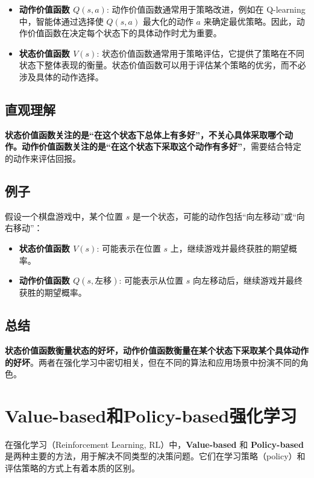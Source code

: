 \documentclass[twocolumn, 10pt]{article} %
\theoremstyle{remark}
\begin{document}
\begin{itemize}
    \item \textbf{动作价值函数 \(Q(s, a)\)}: 动作价值函数通常用于策略改进，例如在 Q-learning 中，智能体通过选择使 \(Q(s, a)\) 最大化的动作 \(a\) 来确定最优策略。因此，动作价值函数在决定每个状态下的具体动作时尤为重要。

    \item \textbf{状态价值函数 \(V(s)\)}: 状态价值函数通常用于策略评估，它提供了策略在不同状态下整体表现的衡量。状态价值函数可以用于评估某个策略的优劣，而不必涉及具体的动作选择。
\end{itemize}

\subsection{直观理解}

\textbf{状态价值函数关注的是“在这个状态下总体上有多好”，不关心具体采取哪个动作。动作价值函数关注的是“在这个状态下采取这个动作有多好”}，需要结合特定的动作来评估回报。

\subsection{例子}

假设一个棋盘游戏中，某个位置 \(s\) 是一个状态，可能的动作包括“向左移动”或“向右移动”：
\begin{itemize}
    \item \textbf{状态价值函数 \(V(s)\)}: 可能表示在位置 \(s\) 上，继续游戏并最终获胜的期望概率。
    \item \textbf{动作价值函数 \(Q(s, \text{左移})\)}: 可能表示从位置 \(s\) 向左移动后，继续游戏并最终获胜的期望概率。
\end{itemize}

\subsection{总结}

\textbf{状态价值函数衡量状态的好坏，动作价值函数衡量在某个状态下采取某个具体动作的好坏}。两者在强化学习中密切相关，但在不同的算法和应用场景中扮演不同的角色。


\section{Value-based和Policy-based强化学习}

在强化学习（Reinforcement Learning, RL）中，\textbf{Value-based} 和 \textbf{Policy-based} 是两种主要的方法，用于解决不同类型的决策问题。它们在学习策略（policy）和评估策略的方式上有着本质的区别。
\end{document}
